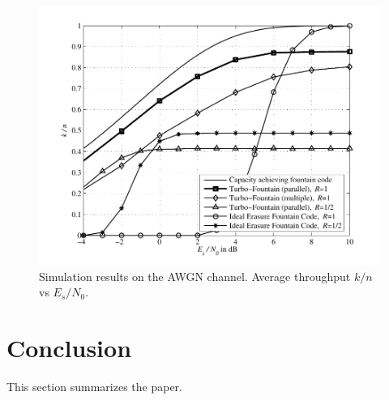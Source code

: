 \documentclass[journal, a4paper]{IEEEtran}
\begin{document}
	\begin{figure}[!hbt]
		\begin{center}
		\includegraphics[width=\columnwidth]{plot_tf}
		\caption{Simulation results on the AWGN channel. Average throughput $k/n$ vs $E_s/N_0$.}
		\label{fig:tf_plot}
		\end{center}
	\end{figure}

\section{Conclusion}
	This section summarizes the paper.
\end{document}
